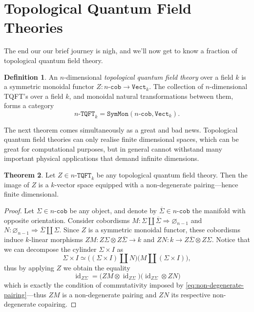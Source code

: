 \documentclass[11pt, reqno]{amsart}
\theoremstyle{definition}
\newtheorem{theorem}{Theorem}[section]
\newtheorem{definition}[theorem]{Definition}
\newcommand{\disj}{\amalg}     %
\newcommand{\iso}{\simeq}
\newcommand{\nat}{\Rightarrow}
\renewcommand{\emptyset}{\varnothing}
\newcommand{\catfont}{\texttt}
\newcommand{\Vect}{{\catfont{Vect}}}        %
\DeclareMathOperator{\Id}{id}     %
\newcommand{\Cob}[1]{{#1}\text{-}{\catfont{cob}}} %
\newcommand{\tqft}[1]{{#1}\text{-}{\catfont{TQFT}}} %
\newcommand{\SymMon}{{\catfont{SymMon}}} %
\begin{document}
\section{Topological Quantum Field Theories}

The end our our brief journey is nigh, and we'll now get to know a fraction
of topological quantum field theory.

\begin{definition}
\label{def:tqft}
An \(n\)-dimensional \emph{topological quantum field theory} over a field \(k\)
is a symmetric monoidal functor \(Z: \Cob n \to \Vect_k\). The
collection of \(n\)-dimensional TQFT's over a field \(k\), and monoidal natural
transformations between them, forms a category
\[
\tqft{n}_k = \SymMon(\Cob n, \Vect_k).
\]
\end{definition}

The next theorem comes simultaneously as a great and bad news. Topological
quantum field theories can only realise finite dimensional spaces, which can be
great for computational purposes, but in general cannot withstand many important
physical applications that demand infinite dimensions.

\begin{theorem}
\label{thm:tqft-image-is-finite-dimensional}
Let \(Z \in \tqft{n}_k\) be any topological quantum field theory. Then
the image of \(Z\) is a \(k\)-vector space equipped with a
non-degenerate pairing---hence finite dimensional.
\end{theorem}

\begin{proof}
Let \(\Sigma \in \Cob n\) be any object, and denote by
\(\overline \Sigma \in \Cob n\) the manifold with opposite orientation. Consider
cobordisms \(M: \Sigma \disj \overline \Sigma \nat \emptyset_{n-1}\) and
\(N: \emptyset_{n-1} \nat \overline \Sigma \disj \Sigma\). Since \(Z\)
is a symmetric monoidal functor, these cobordisms induce \(k\)-linear morphisms
\(Z M: Z \Sigma \otimes Z \overline \Sigma \to k\)
and \(Z N: k \to Z \overline \Sigma \otimes Z
\Sigma\). Notice that we can decompose the cylinder \(\Sigma \times I\) as
\[
\Sigma \times I
\iso \big( (\Sigma \times I) \disj N \big) \big( M \disj (\Sigma \times I) \big),
\]
thus by applying \(Z\) we obtain the equality
\[
\Id_{Z \Sigma}
= \big( Z M \otimes \Id_{Z \Sigma} \big)
\big( \Id_{Z \Sigma} \otimes Z N \big)
\]
which is exactly the condition of commutativity imposed by
\cref{eq:non-degenerate-pairing}---thus \(Z M\) is a non-degenerate
pairing and \(Z N\) its respective non-degenerate copairing.
\end{proof}
\end{document}
